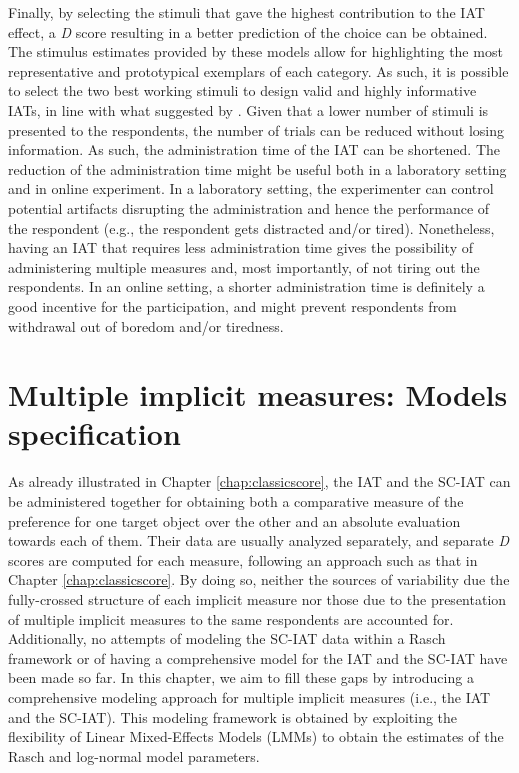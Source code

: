 \documentclass[12pt]{book}
\begin{document}
Finally, by selecting the stimuli that gave the highest contribution to the IAT effect, a \emph{D} score resulting in a better prediction of the choice can be obtained. 
The stimulus estimates provided by these models allow for highlighting the most representative and prototypical exemplars of each category. As such, it is possible to select the two best working stimuli to design valid and highly informative IATs, in line with what suggested by .
	Given that a lower number of stimuli is presented to the respondents, the number of trials can be reduced without losing information. As such, the administration time of the IAT can be shortened. 
	The reduction of the administration time might be useful both in a laboratory setting and in online experiment. 
	In a laboratory setting, the experimenter can control potential artifacts disrupting the administration and hence the performance of the respondent (e.g., the respondent gets distracted and/or tired).  Nonetheless, having an IAT that requires less administration time gives the possibility of administering multiple measures and, most importantly, of not tiring out the respondents. 
	In an online setting, a shorter administration time is definitely a good incentive for the participation, and might prevent respondents from withdrawal out of boredom and/or tiredness. 


\chapter[Multiple implicit measures: Models specification]{Multiple implicit measures: Models specification} \label{chap:comprehensiveModels}

As already illustrated in Chapter \ref{chap:classicscore}, the IAT and the SC-IAT can be administered together for obtaining both a comparative measure of the preference for one target object over the other and an absolute evaluation towards each of them. 
	Their data are usually analyzed separately, and separate \emph{D} scores are computed for each measure, following an approach such as that in Chapter \ref{chap:classicscore}. 
	By doing so, neither the sources of variability due the fully-crossed structure of each implicit measure nor those due to the presentation of multiple implicit measures to the same respondents are accounted for.
Additionally, no attempts of modeling the SC-IAT data within a Rasch framework or of having a comprehensive model for the IAT and the SC-IAT have been made so far.
In this chapter, we aim to fill these gaps by introducing a comprehensive modeling approach for multiple implicit measures (i.e., the IAT and the SC-IAT). This modeling framework is obtained by exploiting the flexibility of Linear Mixed-Effects Models (LMMs) to obtain the estimates of the Rasch and log-normal model parameters. 
\end{document}
